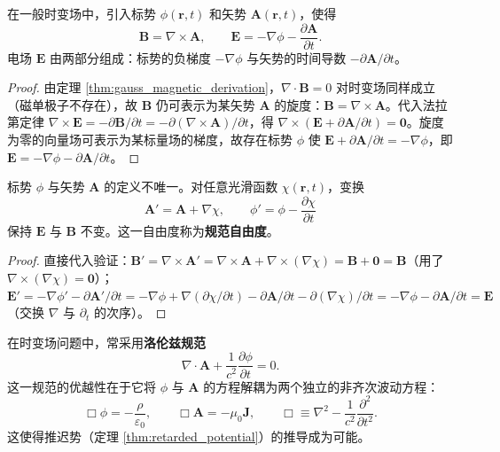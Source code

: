 \begin{theorem}[时变场的标势与矢势表示]\label{thm:scalar_vector_potential}
在一般时变场中，引入标势 $\phi(\mathbf{r}, t)$ 和矢势 $\mathbf{A}(\mathbf{r}, t)$，使得
\[
\boxed{\mathbf{B} = \nabla \times \mathbf{A}}, \qquad
\boxed{\mathbf{E} = -\nabla \phi - \frac{\partial \mathbf{A}}{\partial t}}.
\]
电场 $\mathbf{E}$ 由两部分组成：标势的负梯度 $-\nabla \phi$ 与矢势的时间导数 $-\partial\mathbf{A}/\partial t$。
\end{theorem}

\begin{proof}
由定理 \ref{thm:gauss_magnetic_derivation}，$\nabla \cdot \mathbf{B} = 0$ 对时变场同样成立（磁单极子不存在），故 $\mathbf{B}$ 仍可表示为某矢势 $\mathbf{A}$ 的旋度：$\mathbf{B} = \nabla \times \mathbf{A}$。代入法拉第定律 $\nabla\times\mathbf{E} = -\partial\mathbf{B}/\partial t = -\partial(\nabla\times\mathbf{A})/\partial t$，得 $\nabla\times(\mathbf{E} + \partial\mathbf{A}/\partial t) = \mathbf{0}$。旋度为零的向量场可表示为某标量场的梯度，故存在标势 $\phi$ 使 $\mathbf{E} + \partial\mathbf{A}/\partial t = -\nabla\phi$，即 $\mathbf{E} = -\nabla\phi - \partial\mathbf{A}/\partial t$。
\end{proof}

\begin{property}[规范自由度]\label{prop:gauge_freedom}
标势 $\phi$ 与矢势 $\mathbf{A}$ 的定义不唯一。对任意光滑函数 $\chi(\mathbf{r}, t)$，变换
\[
\mathbf{A}' = \mathbf{A} + \nabla \chi, \qquad \phi' = \phi - \frac{\partial \chi}{\partial t}
\]
保持 $\mathbf{E}$ 与 $\mathbf{B}$ 不变。这一自由度称为\textbf{规范自由度}。
\end{property}

\begin{proof}
直接代入验证：$\mathbf{B}' = \nabla\times\mathbf{A}' = \nabla\times\mathbf{A} + \nabla\times(\nabla\chi) = \mathbf{B} + \mathbf{0} = \mathbf{B}$（用了 $\nabla\times(\nabla\chi) = \mathbf{0}$）；$\mathbf{E}' = -\nabla\phi' - \partial\mathbf{A}'/\partial t = -\nabla\phi + \nabla(\partial\chi/\partial t) - \partial\mathbf{A}/\partial t - \partial(\nabla\chi)/\partial t = -\nabla\phi - \partial\mathbf{A}/\partial t = \mathbf{E}$（交换 $\nabla$ 与 $\partial_t$ 的次序）。
\end{proof}

\begin{remark}[洛伦兹规范]\label{rem:lorentz_gauge}
在时变场问题中，常采用\textbf{洛伦兹规范}
\[
\nabla \cdot \mathbf{A} + \frac{1}{c^2}\frac{\partial \phi}{\partial t} = 0.
\]
这一规范的优越性在于它将 $\phi$ 与 $\mathbf{A}$ 的方程解耦为两个独立的非齐次波动方程：
\[
\Box \phi = -\frac{\rho}{\varepsilon_0}, \qquad \Box \mathbf{A} = -\mu_0 \mathbf{J}, \qquad \Box \equiv \nabla^2 - \frac{1}{c^2}\frac{\partial^2}{\partial t^2}.
\]
这使得推迟势（定理 \ref{thm:retarded_potential}）的推导成为可能。
\end{remark}

